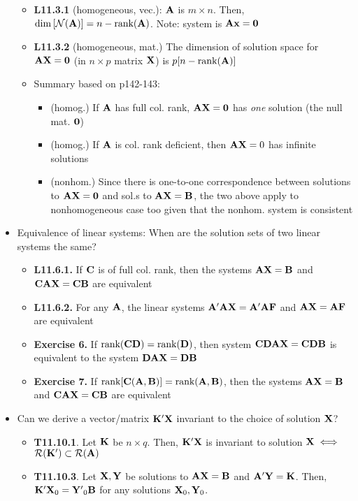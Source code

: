 \documentclass[a4paper, oneside]{book}
\begin{document}
\begin{itemize}
\begin{itemize}
	\item \textbf{L11.3.1} (homogeneous, vec.): $\mathbf{A}$ is $m\times n$. Then, $\dim\left[\mathcal{N}(\mathbf{A})\right]=n-\text{rank}(\mathbf{A})$. Note: system is $\mathbf{Ax=0}$
	\item \textbf{L11.3.2} (homogeneous, mat.) The dimension of solution space for $\mathbf{AX=0}$ (in $n\times p$ matrix $\mathbf{X}$) is $p[n-\text{rank}(\mathbf{A})]$
	\item Summary based on p142-143:
		\begin{itemize}
		\item (homog.) If $\mathbf{A}$ has full col. rank, $\mathbf{AX}=\mathbf{0}$ has \textit{one} solution (\ie the null mat. $\mathbf{0}$)
		\item (homog.) If $\mathbf{A}$ is col. rank deficient, then $\mathbf{AX}=0$ has infinite solutions
		\item (nonhom.) Since there is one-to-one correspondence between solutions to $\mathbf{AX=0}$ and sol.s to $\mathbf{AX=B}$, the two above apply to nonhomogeneous case too given that the nonhom. system is consistent
		\end{itemize}
	\end{itemize}
\item Equivalence of linear systems: When are the solution sets of two linear systems the same?
	\begin{itemize}
	\item \textbf{L11.6.1.} If $\mathbf{C}$ is of full col. rank, then the systems $\mathbf{AX=B}$ and $\mathbf{CAX=CB}$ are equivalent
	\item \textbf{L11.6.2.} For any $\mathbf{A}$, the linear systems $\mathbf{A'AX=A'AF}$ and $\mathbf{AX=AF}$ are equivalent
	\item \textbf{Exercise 6.} If $\text{rank}(\mathbf{CD})=\text{rank}(\mathbf{D})$, then system $\mathbf{CDAX}=\mathbf{CDB}$ is equivalent to the system $\mathbf{DAX}=\mathbf{DB}$
	\item \textbf{Exercise 7.} If $\text{rank}[\mathbf{C(A,B)}]=\text{rank}(\mathbf{A,B})$, then the systems $\mathbf{AX=B}$ and $\mathbf{CAX=CB}$ are equivalent
	\end{itemize}
\item Can we derive a vector/matrix $\mathbf{K'X}$ invariant to the choice of solution $\mathbf{X}$?
	\begin{itemize}
	\item \textbf{T11.10.1}. Let $\mathbf{K}$ be $n\times q$. Then, $\mathbf{K'X}$ is invariant to solution $\mathbf{X} \iff$ $\mathcal{R}(\mathbf{K}') \subset \mathcal{R}(\mathbf{A})$
	\item \textbf{T11.10.3}. Let $\mathbf{X,Y}$ be solutions to $\mathbf{AX=B}$ and $\mathbf{A'Y=K}$. Then, $\mathbf{K'X}_0=\mathbf{Y'}_0\mathbf{B}$ for any solutions $\mathbf{X}_0,\mathbf{Y}_0$.

\end{itemize}
\end{itemize}
\end{document}
